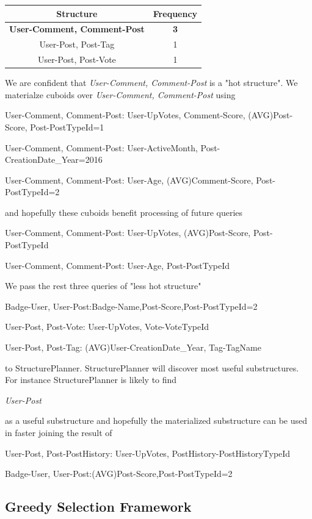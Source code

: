 \begin{center}
	\begin{tabular}{ | c | c |}  
		\hline
		Structure	&Frequency	\\ \hline 
		\textbf{User-Comment, Comment-Post} 	&\textbf{3} \\ \hline
		User-Post, Post-Tag 	&1 \\ \hline
		User-Post, Post-Vote	&1 \\ \hline
	\end{tabular}
	\end {center}
	
We are confident that \textit{User-Comment, Comment-Post} is a "hot structure". We materialze cuboids over \textit{User-Comment, Comment-Post} using

User-Comment, Comment-Post: User-UpVotes, Comment-Score, (AVG)Post-Score, Post-PostTypeId=1

User-Comment, Comment-Post: User-ActiveMonth, Post-CreationDate_Year=2016

User-Comment, Comment-Post: User-Age, (AVG)Comment-Score, Post-PostTypeId=2

and hopefully these cuboids benefit processing of future queries

User-Comment, Comment-Post: User-UpVotes, (AVG)Post-Score, Post-PostTypeId

User-Comment, Comment-Post: User-Age, Post-PostTypeId

We pass the rest three queries of "less hot structure" 

Badge-User, User-Post:Badge-Name,Post-Score,Post-PostTypeId=2

User-Post, Post-Vote: User-UpVotes, Vote-VoteTypeId

User-Post, Post-Tag: (AVG)User-CreationDate_Year, Tag-TagName

to StructurePlanner. StructurePlanner will discover most useful substructures. For instance StructurePlanner is likely to find

\textit{User-Post }

as a useful substructure and hopefully the materialized substructure can be used in faster joining the result of 

User-Post, Post-PostHistory: User-UpVotes, PostHistory-PostHistoryTypeId

Badge-User, User-Post:(AVG)Post-Score,Post-PostTypeId=2

\subsection{Greedy Selection Framework}

